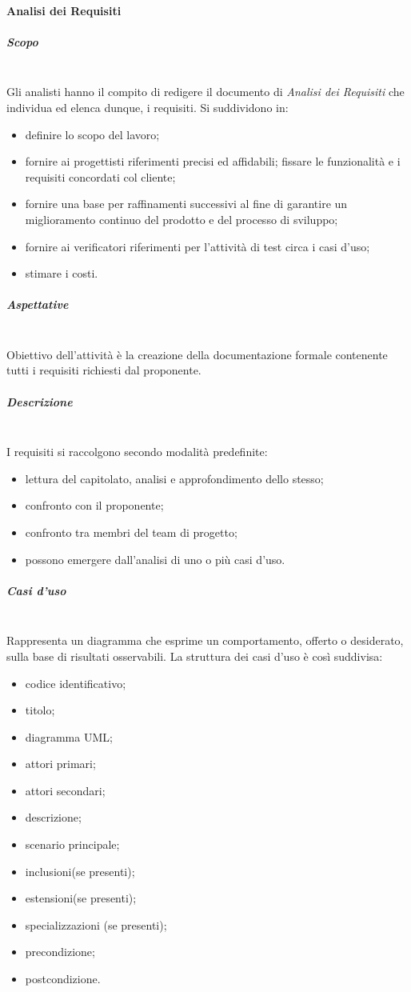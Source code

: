 		\paragraph{Analisi dei Requisiti}
			\subparagraph{Scopo} \mbox{}\\
			Gli analisti hanno il compito di redigere il documento di
			\textit{Analisi dei Requisiti} che individua ed elenca dunque, i requisiti.
			Si suddividono in:
			\begin{itemize}
				\item definire lo scopo del lavoro;
				\item fornire ai progettisti riferimenti precisi ed affidabili;
				fissare le funzionalità e i requisiti concordati col cliente;
				\item fornire  una  base  per  raffinamenti  successivi  al  fine  di  garantire  un miglioramento continuo del prodotto e del processo di sviluppo;
				\item fornire ai verificatori riferimenti per l'attività di test circa i casi d'uso;
				\item stimare i costi.
			\end{itemize}
			\subparagraph{Aspettative} \mbox{}\\
			Obiettivo dell'attività è la creazione della documentazione formale contenente tutti i
			requisiti richiesti dal proponente.
			\subparagraph{Descrizione} \mbox{}\\
			I requisiti si raccolgono secondo modalità predefinite:
			\begin{itemize}
				\item lettura del capitolato, analisi e approfondimento dello stesso;
				\item confronto con il proponente;
				\item confronto tra membri del team di progetto;
				\item possono emergere dall'analisi di uno o più casi d'uso.
			\end{itemize}
			\subparagraph{Casi d'uso} \mbox{}\\
			Rappresenta un diagramma che esprime un comportamento,
			offerto o desiderato, sulla base di risultati osservabili.
			La struttura dei casi d'uso è così suddivisa:
			\begin{itemize}
				\item codice identificativo;
				\item titolo;
				\item diagramma UML;
				\item attori primari;
				\item attori secondari;
				\item descrizione;
				\item scenario principale;
				\item inclusioni(se presenti);
				\item estensioni(se presenti);
				\item specializzazioni (se presenti);
				\item precondizione;
				\item postcondizione.
			\end{itemize}
